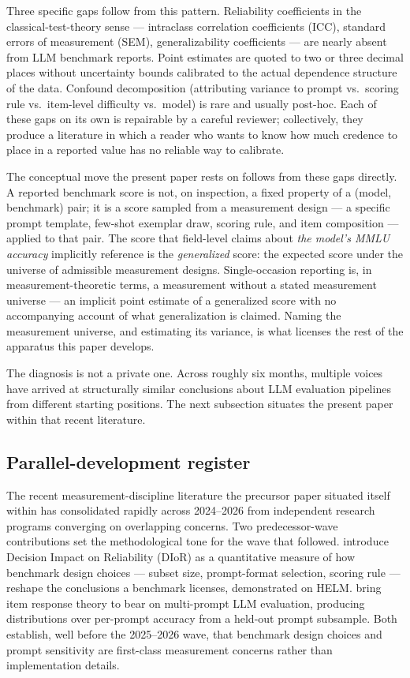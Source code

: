 \documentclass[11pt]{article}
\begin{document}
Three specific gaps follow from this pattern. Reliability coefficients in the classical-test-theory sense --- intraclass correlation coefficients (ICC), standard errors of measurement (SEM), generalizability coefficients --- are nearly absent from LLM benchmark reports. Point estimates are quoted to two or three decimal places without uncertainty bounds calibrated to the actual dependence structure of the data. Confound decomposition (attributing variance to prompt vs.\ scoring rule vs.\ item-level difficulty vs.\ model) is rare and usually post-hoc. Each of these gaps on its own is repairable by a careful reviewer; collectively, they produce a literature in which a reader who wants to know how much credence to place in a reported value has no reliable way to calibrate.

The conceptual move the present paper rests on follows from these gaps directly. A reported benchmark score is not, on inspection, a fixed property of a (model, benchmark) pair; it is a score sampled from a measurement design --- a specific prompt template, few-shot exemplar draw, scoring rule, and item composition --- applied to that pair. The score that field-level claims about \emph{the model's MMLU accuracy} implicitly reference is the \emph{generalized} score: the expected score under the universe of admissible measurement designs. Single-occasion reporting is, in measurement-theoretic terms, a measurement without a stated measurement universe --- an implicit point estimate of a generalized score with no accompanying account of what generalization is claimed. Naming the measurement universe, and estimating its variance, is what licenses the rest of the apparatus this paper develops.

The diagnosis is not a private one. Across roughly six months, multiple voices have arrived at structurally similar conclusions about LLM evaluation pipelines from different starting positions. The next subsection situates the present paper within that recent literature.

\subsection{Parallel-development register}
\label{sec:parallel-dev-intro}

The recent measurement-discipline literature the precursor paper situated itself within has consolidated rapidly across 2024--2026 from independent research programs converging on overlapping concerns. Two predecessor-wave contributions set the methodological tone for the wave that followed. \citet{perlitz2024efficientbenchmarking} introduce Decision Impact on Reliability (DIoR) as a quantitative measure of how benchmark design choices --- subset size, prompt-format selection, scoring rule --- reshape the conclusions a benchmark licenses, demonstrated on HELM. \citet{polo2024promptevalUniverso} bring item response theory to bear on multi-prompt LLM evaluation, producing distributions over per-prompt accuracy from a held-out prompt subsample. Both establish, well before the 2025--2026 wave, that benchmark design choices and prompt sensitivity are first-class measurement concerns rather than implementation details.
\end{document}
